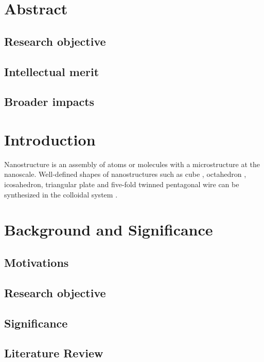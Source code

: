 \section{Abstract}

\subsection{Research objective}

\subsection{Intellectual merit}

\subsection{Broader impacts}



\section{Introduction}

Nanostructure is an assembly of atoms or molecules with a microstructure at the nanoscale. Well-defined shapes of nanostructures such as cube \cite{Im_2005}, octahedron \cite{Xia_2012}, icosahedron, triangular plate and five-fold twinned pentagonal wire can be synthesized in the colloidal system \cite{Xia_2008}.


\section{Background and Significance}

\subsection{Motivations}

\subsection{Research objective}

\subsection{Significance}

\subsection{Literature Review}

